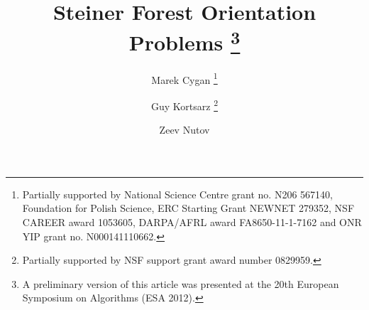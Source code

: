 \documentclass[envcountsame]{llncs}
\begin{document}
\title{Steiner Forest Orientation Problems \thanks{A preliminary version of this article was presented at the 20th European Symposium on Algorithms (ESA 2012).}}

\author{Marek Cygan
 \thanks{Partially supported by National Science Centre grant no. N206 567140, Foundation for Polish Science, ERC Starting Grant NEWNET 279352, NSF CAREER award 1053605, DARPA/AFRL award FA8650-11-1-7162 and ONR YIP grant no. N000141110662.}
\and 
Guy Kortsarz \thanks{Partially supported by NSF support grant award number 0829959.}
\and 
Zeev Nutov
        }



\maketitle

\newcommand {\ignore} [1] {}


\newcommand{\cur}{{\rm cur}}
\end{document}
